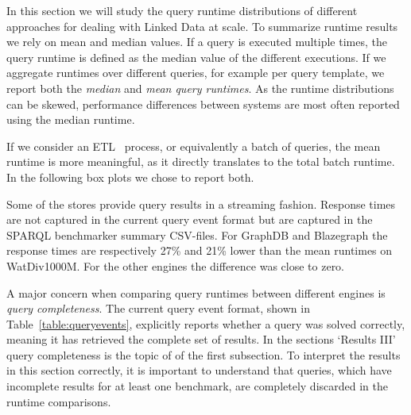 In this section we will study the query runtime distributions of different approaches for dealing with Linked Data at scale. To summarize runtime results we rely on mean and median values. If a query is executed multiple times, the query runtime is defined as the median value of the different executions. If we aggregate runtimes over different queries, for example per query template, we report both the \emph{median} and \emph{mean query runtimes}. As the runtime distributions can be skewed, performance differences between systems are most often reported using the median runtime. 

If we consider an ETL~\cite{ETL} process, or equivalently a batch of queries, the mean runtime is more meaningful, as it directly translates to the total batch runtime. In the following box plots we chose to report both.

Some of the stores provide query results in a streaming fashion. Response times are not captured in the current query event format but are captured in the SPARQL benchmarker summary CSV-files. For GraphDB and Blazegraph the response times are respectively 27\% and 21\% lower than the mean runtimes on WatDiv1000M. For the other engines the difference was close to zero.

A major concern when comparing query runtimes between different engines is \emph{query completeness}. The current query event format, shown in Table~\ref{table:queryevents}, explicitly reports whether a query was solved correctly, meaning it has retrieved the complete set of results. In the sections `Results III' query completeness is the topic of of the first subsection.
To interpret the results in this section correctly, it is important to understand that queries, which have incomplete results for at least one benchmark, are completely discarded in the runtime comparisons.

